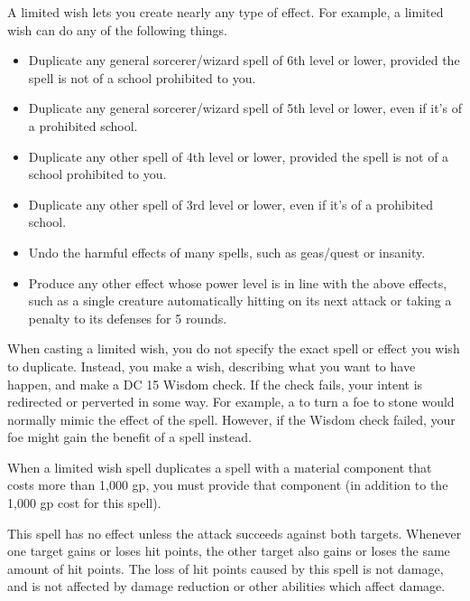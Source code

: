 \spelleffect A limited wish lets you create nearly any type of effect. For example, a limited wish can do any of the following things.
\begin{itemize}
    \item Duplicate any general sorcerer/wizard spell of 6th level or lower, provided the spell is not of a school prohibited to you.
    \item Duplicate any general sorcerer/wizard spell of 5th level or lower, even if it's of a prohibited school.
    \item Duplicate any other spell of 4th level or lower, provided the spell is not of a school prohibited to you.
    \item Duplicate any other spell of 3rd level or lower, even if it's of a prohibited school.
    \item Undo the harmful effects of many spells, such as geas/quest or insanity.
    \item Produce any other effect whose power level is in line with the above effects, such as a single creature automatically hitting on its next attack or taking a  penalty to its defenses for 5 rounds.
\end{itemize}
\par When casting a limited wish, you do not specify the exact spell or effect you wish to duplicate. Instead, you make a wish, describing what you want to have happen, and make a DC 15 Wisdom check. If the check fails, your intent is redirected or perverted in some way. For example, a  to turn a foe to stone would normally mimic the  effect of the  spell. However, if the Wisdom check failed, your foe might gain the benefit of a  spell instead.
\par When a limited wish spell duplicates a spell with a material component that costs more than 1,000 gp, you must provide that component (in addition to the 1,000 gp cost for this spell).

\spelldur{\durshort}
\spellspecial This spell has no effect unless the attack succeeds against both targets.
\spellsuccess Whenever one target gains or loses hit points, the other target also gains or loses the same amount of hit points.
\spellnotes The loss of hit points caused by this spell is not damage, and is not affected by damage reduction or other abilities which affect damage.

